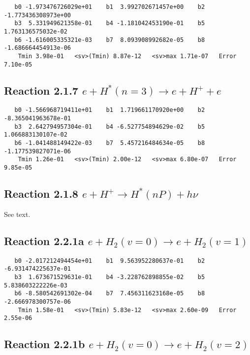 \documentclass[12pt]{article}
\begin{document}
\begin{small}\begin{verbatim}
   b0 -1.973476726029e+01    b1  3.992702671457e+00    b2 -1.773436308973e+00
   b3  5.331949621358e-01    b4 -1.181042453190e-01    b5  1.763136575032e-02
   b6 -1.616005335321e-03    b7  8.093908992682e-05    b8 -1.686664454913e-06
    Tmin 3.98e-01   <sv>(Tmin) 8.87e-12   <sv>max 1.71e-07   Error 7.10e-05
\end{verbatim}\end{small}

\newpage
\subsection{
Reaction 2.1.7 $   e + H^*(n=3) \rightarrow e + H^+ + e$}


\begin{small}\begin{verbatim}
   b0 -1.566968719411e+01    b1  1.719661170920e+00    b2 -8.365041963678e-01
   b3  2.642794957304e-01    b4 -6.527754894629e-02    b5  1.066883130107e-02
   b6 -1.041488149422e-03    b7  5.457216484634e-05    b8 -1.177539827071e-06
    Tmin 1.26e-01   <sv>(Tmin) 2.00e-12   <sv>max 6.80e-07   Error 9.85e-05
\end{verbatim}\end{small}

\newpage
\subsection{
Reaction 2.1.8 $  e + H^+ \rightarrow H^*(nP) + h\nu $}
See text.

\newpage
\subsection{
Reaction 2.2.1a $  e + H_2(v=0) \rightarrow e + H_2(v=1)$}


\begin{small}\begin{verbatim}
   b0 -2.017212494454e+01    b1  9.563952280637e-01    b2 -6.931474225637e-01
   b3  1.673671529631e-01    b4 -3.228762898855e-02    b5  5.838603222226e-03
   b6 -8.580542691302e-04    b7  7.456311623168e-05    b8 -2.666978300757e-06
    Tmin 1.58e-01   <sv>(Tmin) 5.83e-12   <sv>max 2.60e-09   Error 2.55e-06
\end{verbatim}\end{small}

\newpage
\subsection{
Reaction 2.2.1b $  e + H_2(v=0) \rightarrow e + H_2(v=2)$}
\end{document}
